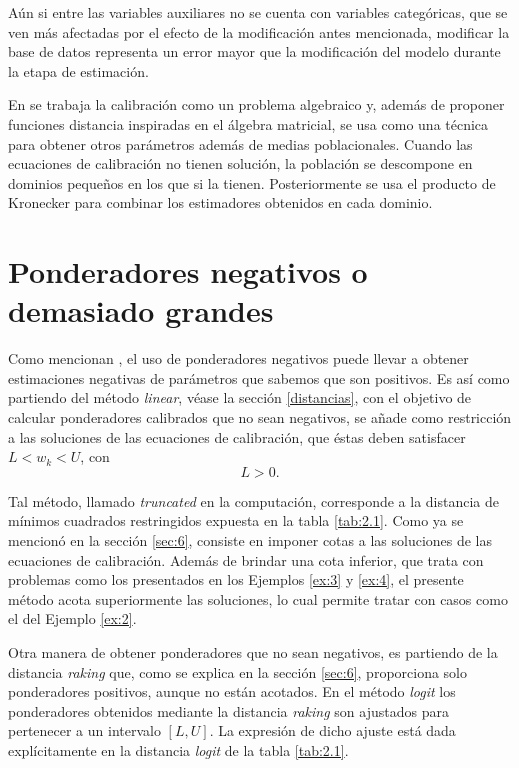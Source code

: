 \documentclass[a4paper,twoside,openright,12pt]{book}
\theoremstyle{definition}
\numberwithin{equation}{chapter}
\numberwithin{figure}{chapter}
\numberwithin{table}{chapter}
\numberwithin{theorem}{chapter}
\numberwithin{lemma}{chapter}
\begin{document}
Aún si entre las variables auxiliares no se cuenta con variables categóricas, que se ven más afectadas por el efecto de la modificación antes mencionada, modificar la base de datos representa un error mayor que la modificación del modelo durante la etapa de estimación.

En \cite{CIS-156393} se trabaja la calibración como un problema algebraico y, además de proponer funciones distancia inspiradas en el álgebra matricial, se usa como una técnica para obtener otros parámetros además de medias poblacionales. Cuando las ecuaciones de calibración no tienen solución, la población se descompone en dominios pequeños en los que si la tienen. Posteriormente se usa el producto de Kronecker para combinar los estimadores obtenidos en cada dominio.
\section{Ponderadores negativos o demasiado grandes}\label{sec:10.2}
Como mencionan \cite{CIS-549814}, el uso de ponderadores negativos puede llevar a obtener estimaciones negativas de parámetros que sabemos que son positivos. Es así como partiendo del método \textsl{linear}, véase la sección \ref{distancias}, con el objetivo de calcular ponderadores calibrados que no sean negativos, se añade como restricción a las soluciones de las ecuaciones de calibración, que éstas deben satisfacer $L<w_k<U$, con
$$L>0.$$

Tal método, llamado \textsl{truncated} en la computación, corresponde a la distancia de mínimos cuadrados restringidos expuesta en la tabla \ref{tab:2.1}. Como ya se mencionó en la sección \ref{sec:6}, consiste en imponer cotas a las soluciones de las ecuaciones de calibración. Además de brindar una cota inferior, que trata con problemas como los presentados en los Ejemplos \ref{ex:3} y \ref{ex:4}, el presente método acota superiormente las soluciones, lo cual permite tratar con casos como el del Ejemplo \ref{ex:2}.%

Otra manera de obtener ponderadores que no sean negativos, es partiendo de la distancia \textsl{raking} que, como se explica en la sección \ref{sec:6}, proporciona solo ponderadores positivos, aunque no están acotados. En el método \textsl{logit} los ponderadores obtenidos mediante la distancia \textsl{raking} son ajustados para pertenecer a un intervalo $[L,U]$. La expresión de dicho ajuste está dada explícitamente en la distancia \textsl{logit} de la tabla \ref{tab:2.1}.
\end{document}
